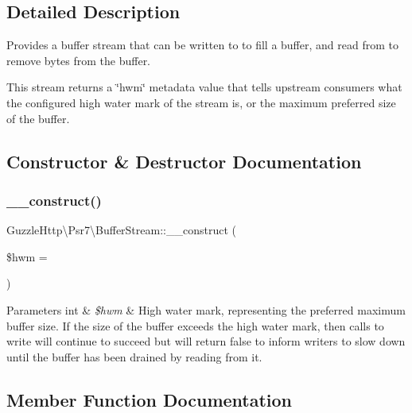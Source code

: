 \subsection{Detailed Description}
Provides a buffer stream that can be written to to fill a buffer, and read from to remove bytes from the buffer.

This stream returns a \char`\"{}hwm\char`\"{} metadata value that tells upstream consumers what the configured high water mark of the stream is, or the maximum preferred size of the buffer. 

\subsection{Constructor \& Destructor Documentation}
\mbox{\label{classGuzzleHttp_1_1Psr7_1_1BufferStream_aa4791b10406d77e1ca7e6bd335671328}} 
\subsubsection{\texorpdfstring{\+\_\+\+\_\+construct()}{\_\_construct()}}
{\footnotesize\ttfamily Guzzle\+Http\textbackslash{}\+Psr7\textbackslash{}\+Buffer\+Stream\+::\+\_\+\+\_\+construct (\begin{DoxyParamCaption}\item[{}]{\$hwm = {} }\end{DoxyParamCaption})}


\begin{DoxyParams}[1]{Parameters}
int & {\em \$hwm} & High water mark, representing the preferred maximum buffer size. If the size of the buffer exceeds the high water mark, then calls to write will continue to succeed but will return false to inform writers to slow down until the buffer has been drained by reading from it. \\
\hline
\end{DoxyParams}


\subsection{Member Function Documentation}
\mbox{\label{classGuzzleHttp_1_1Psr7_1_1BufferStream_a263174c64e3f1690c1234de871312dfb}} 
